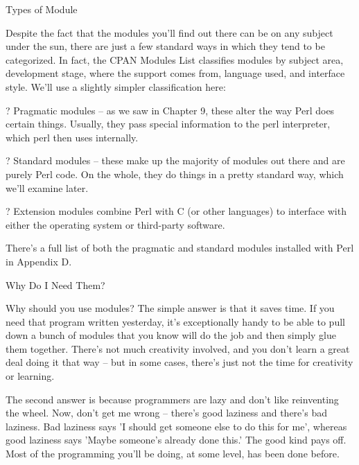 \documentclass[a4paper,11pt]{book}
\begin{document}
\noindent 

\noindent 

\noindent Types of Module

\noindent 

\noindent Despite the fact that the modules you'll find out there can be on any subject under the sun, there are just a few standard ways in which they tend to be categorized. In fact, the CPAN Modules List classifies modules by subject area, development stage, where the support comes from, language used, and interface style. We'll use a slightly simpler classification here:

\noindent 

\noindent ? Pragmatic modules -- as we saw in Chapter 9, these alter the way Perl does certain things. Usually, they pass special information to the perl interpreter, which perl then uses internally.

\noindent 

\noindent ? Standard modules -- these make up the majority of modules out there and are purely Perl code. On the whole, they do things in a pretty standard way, which we'll examine later.

\noindent ? Extension modules combine Perl with C (or other languages) to interface with either the operating system or third-party software.

\noindent 

\noindent There's a full list of both the pragmatic and standard modules installed with Perl in Appendix D.

\noindent  

\noindent  

\noindent  

\noindent  

\noindent 

\noindent 

\noindent Why Do I Need Them?

\noindent 

\noindent Why should you use modules? The simple answer is that it saves time. If you need that program written yesterday, it's exceptionally handy to be able to pull down a bunch of modules that you know will do the job and then simply glue them together. There's not much creativity involved, and you don't learn a great deal doing it that way -- but in some cases, there's just not the time for creativity or learning.

\noindent 

\noindent The second answer is because programmers are lazy and don't like reinventing the wheel. Now, don't get me wrong -- there's good laziness and there's bad laziness. Bad laziness says 'I should get someone else to do this for me', whereas good laziness says 'Maybe someone's already done this.' The good kind pays off. Most of the programming you'll be doing, at some level, has been done before.
\end{document}
